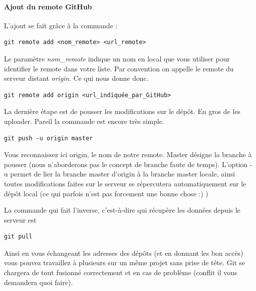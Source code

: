 \documentclass[a4paper]{article}
\begin{document}
\paragraph{Ajout du remote GitHub} L'ajout se fait grâce à la commande :

\begin{verbatim}
git remote add <nom_remote> <url_remote>
\end{verbatim}

Le paramètre \emph{nom\_remote} indique un nom en local que vous utiliser pour identifier le remote dans votre liste. Par convention on  appelle le remote du serveur distant \textit{origin}. Ce qui nous donne donc.

\begin{verbatim}
git remote add origin <url_indiquée_par_GitHub>
\end{verbatim}

La dernière étape est de pousser les modifications sur le dépôt. En gros de les uploader. Pareil la commande est encore très simple.

\begin{verbatim}
git push -u origin master
\end{verbatim}

Vous reconnaissez ici origin, le nom de notre remote. Master désigne la branche à pousser (nous n'aborderons pas le concept de branche faute de temps). L'option -u permet de lier la branche master d'origin à la branche master locale, ainsi toutes modifications faites sur le serveur se répercutera automatiquement sur le dépôt local (ce qui parfois n'est pas forcement une bonne chose :) )

La commande qui fait l'inverse, c'est-à-dire qui récupère les données depuis le serveur est
\begin{verbatim}
git pull
\end{verbatim}

Ainsi en vous échangeant les adresses des dépôts (et en donnant les bon accès) vous pouvez travaillez à plusieurs sur un même projet sans prise de tête. Git se chargera de tout fusionné correctement et en cas de problème (conflit il vous demandera quoi faire).
\end{document}

